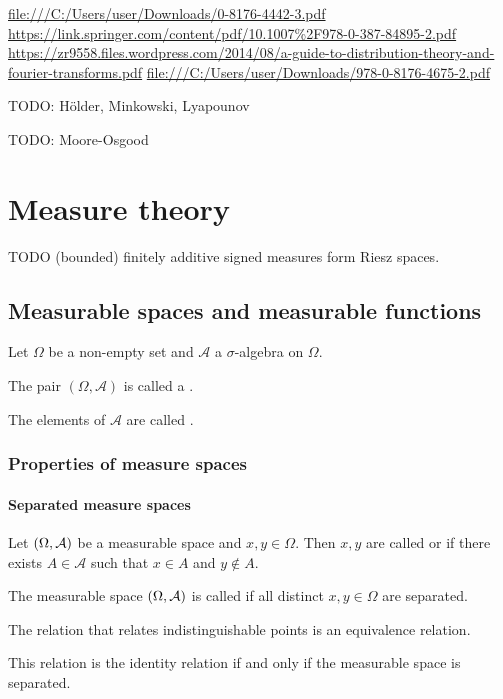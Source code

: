 \url{file:///C:/Users/user/Downloads/0-8176-4442-3.pdf}
\url{https://link.springer.com/content/pdf/10.1007%2F978-0-387-84895-2.pdf}
\url{https://zr9558.files.wordpress.com/2014/08/a-guide-to-distribution-theory-and-fourier-transforms.pdf}
\url{file:///C:/Users/user/Downloads/978-0-8176-4675-2.pdf}

TODO: Hölder, Minkowski, Lyapounov

TODO: Moore-Osgood

\chapter{Measure theory}
TODO (bounded) finitely additive signed measures form Riesz spaces.

\section{Measurable spaces and measurable functions}
\begin{definition}
Let $\Omega$ be a non-empty set and $\mathcal{A}$ a $\sigma$-algebra on $\Omega$.

The pair $(\Omega, \mathcal{A})$ is called a .

The elements of $\mathcal{A}$ are called .
\end{definition}


\subsection{Properties of measure spaces}
\subsubsection{Separated measure spaces}
\begin{definition}
Let $\sSet{\Omega,\mathcal{A}}$ be a measurable space and $x,y\in \Omega$. Then $x,y$ are called  or  if there exists $A\in \mathcal{A}$ such that $x\in A$ and $y\notin A$.

The measurable space $\sSet{\Omega,\mathcal{A}}$ is called  if all distinct $x,y\in \Omega$ are separated.
\end{definition}

\begin{lemma}
The relation that relates indistinguishable points is an equivalence relation.

This relation is the identity relation \textup{if and only if} the measurable space is separated.
\end{lemma}

